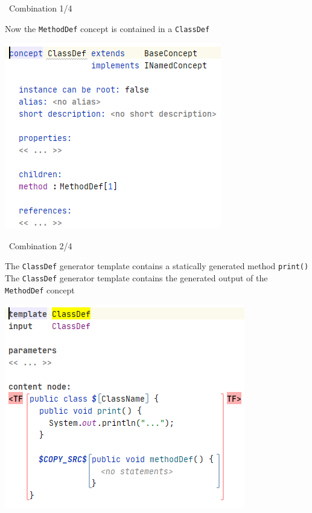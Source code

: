 	\begin{frame}{\workshoptemplate\ Combination 1/4}
	\begin{minipage}{0.52\textwidth}
		Now the \texttt{MethodDef} concept is contained in a \texttt{ClassDef}
	\end{minipage}
	\begin{minipage}{0.4\textwidth}
		\includegraphics[height=0.8\textheight]{illustrations/classDef.png}
	\end{minipage}
	\end{frame}

	\begin{frame}{\workshoptemplate\ Combination 2/4}
	\begin{minipage}{0.52\textwidth}
		The \texttt{ClassDef} generator template contains a statically generated method \texttt{print()}\\
		
		The \texttt{ClassDef} generator template contains the generated output of the \texttt{MethodDef} concept
	\end{minipage}
	\begin{minipage}{0.4\textwidth}
		\includegraphics[height=0.8\textheight]{illustrations/classDefGen.png}
	\end{minipage}
	\end{frame}


